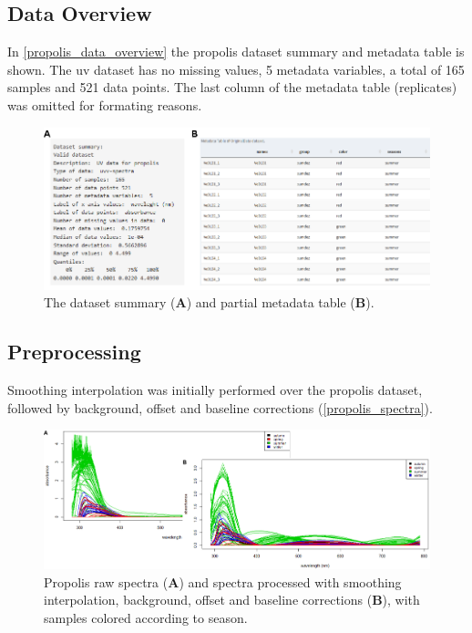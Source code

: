 \subsection{Data Overview}

In \autoref{propolis_data_overview} the propolis dataset summary and metadata table is shown. The \gls{uv} dataset has no missing values, 5 metadata variables, a total of 165 samples and 521 data points. The last column of the metadata table (replicates) was omitted for formating reasons.

\begin{figure}[h]
	\centering
	\includegraphics[width=1\linewidth]{Imagens/Propolis/data_overview}
	\caption{The dataset summary (\textbf{A}) and partial metadata table (\textbf{B}).}
	\label{propolis_data_overview}
\end{figure}


\subsection{Preprocessing}

Smoothing interpolation was initially performed over the propolis dataset, followed by background, offset and baseline corrections (\autoref{propolis_spectra}). 

\begin{figure}[h]
	\centering
	\includegraphics[width=1\linewidth]{Imagens/Propolis/spectra}
	\caption{Propolis raw spectra (\textbf{A}) and spectra processed with smoothing interpolation, background, offset and baseline corrections (\textbf{B}), with samples colored according to season.}
	\label{propolis_spectra}
\end{figure}


